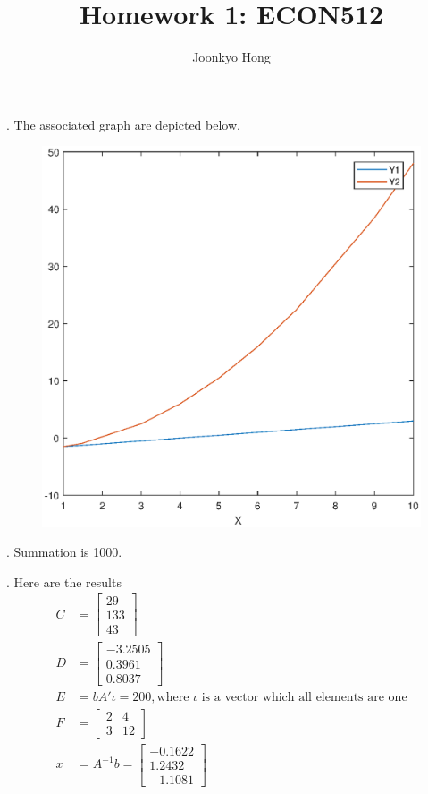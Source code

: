 \documentclass[10pt, letterpaper]{article}
\begin{document}
\title{Homework 1: ECON512}
\author{Joonkyo Hong}
\date{}
\maketitle
\smallskip

. The associated graph are depicted below.

\begin{figure}[!h]
\begin{center}
  \includegraphics[width=0.4\linewidth]{graph1.eps}
  \caption{}
  \label{fig:graph}
\end{center}
\end{figure}

. Summation is 1000.

. Here are the results 
\begin{align}
C & = \begin{bmatrix}
         29 \\ 133 \\ 43
      \end{bmatrix}    \nonumber \\
D & = \begin{bmatrix}
        -3.2505 \\ 0.3961 \\ 0.8037 
       \end{bmatrix}    \nonumber \\
E & = b A' \iota = 200, \text{where $\iota$ is a vector which all elements are one} \nonumber \\
F & = \begin{bmatrix}
          2 & 4 \\
          3 & 12 
      \end{bmatrix} \nonumber \\
x & = A^{-1}b = \begin{bmatrix}
                  -0.1622 \\ 1.2432 \\ -1.1081
                 \end{bmatrix} \nonumber 
\end{align}
\end{document}
